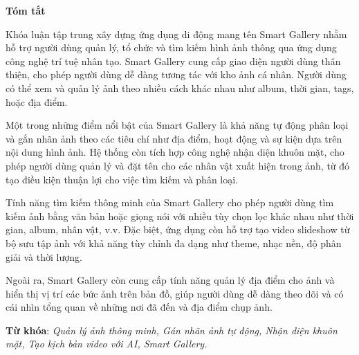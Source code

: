 \begin{center}
\textbf{\large{Tóm tắt}	}
\end{center}


\begin{small}
    Khóa luận tập trung xây dựng ứng dụng di động mang tên Smart Gallery nhằm hỗ trợ người dùng quản lý, tổ chức và tìm kiếm hình ảnh thông qua ứng dụng công nghệ trí tuệ nhân tạo. Smart Gallery cung cấp giao diện người dùng thân thiện, cho phép người dùng dễ dàng tương tác với kho ảnh cá nhân. Người dùng có thể xem và quản lý ảnh theo nhiều cách khác nhau như album, thời gian, tags, hoặc địa điểm.

    Một trong những điểm nổi bật của Smart Gallery là khả năng tự động phân loại và gắn nhãn ảnh theo các tiêu chí như địa điểm, hoạt động và sự kiện dựa trên nội dung hình ảnh. Hệ thống còn tích hợp công nghệ nhận diện khuôn mặt, cho phép người dùng quản lý và đặt tên cho các nhân vật xuất hiện trong ảnh, từ đó tạo điều kiện thuận lợi cho việc tìm kiếm và phân loại.
    
    Tính năng tìm kiếm thông minh của Smart Gallery cho phép người dùng tìm kiếm ảnh bằng văn bản hoặc giọng nói với nhiều tùy chọn lọc khác nhau như thời gian, album, nhân vật, v.v. Đặc biệt, ứng dụng còn hỗ trợ tạo video slideshow từ bộ sưu tập ảnh với khả năng tùy chỉnh đa dạng như theme, nhạc nền, độ phân giải và thời lượng.
    
    Ngoài ra, Smart Gallery còn cung cấp tính năng quản lý địa điểm cho ảnh và hiển thị vị trí các bức ảnh trên bản đồ, giúp người dùng dễ dàng theo dõi và có cái nhìn tổng quan về những nơi đã đến và địa điểm chụp ảnh.


\vspace*{1cm}
\textbf{Từ khóa}: 
\textit{Quản lý ảnh thông minh, Gán nhãn ảnh tự động, Nhận diện khuôn mặt, Tạo kịch bản video với AI, Smart Gallery.}
\end{small}